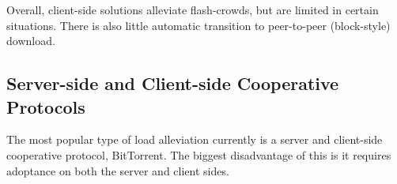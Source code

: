 
Overall, client-side solutions alleviate flash-crowds, but are limited in certain situations. There is also little automatic transition to peer-to-peer (block-style) download.

\subsection{Server-side and Client-side Cooperative Protocols}

The most popular type of load alleviation currently is a server and client-side cooperative protocol, BitTorrent.  The biggest disadvantage of this is it requires adoptance on both the server and client sides.



